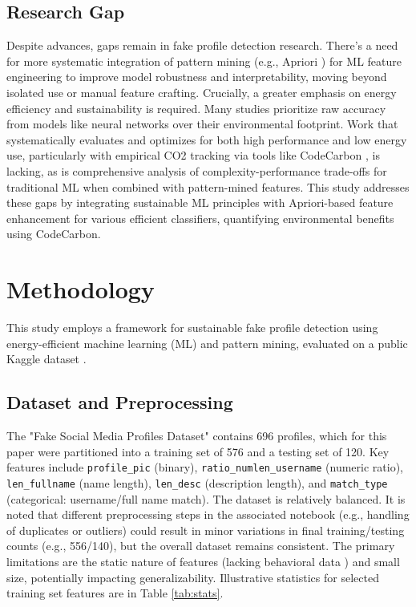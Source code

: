 \documentclass[conference]{IEEEtran}
\begin{document}
\subsection{Research Gap}
Despite advances, gaps remain in fake profile detection research. There's a need for more systematic integration of pattern mining (e.g., Apriori \cite{b10}) for ML feature engineering to improve model robustness and interpretability, moving beyond isolated use or manual feature crafting. Crucially, a greater emphasis on energy efficiency and sustainability is required. Many studies prioritize raw accuracy from models like neural networks \cite{b6, b4} over their environmental footprint. Work that systematically evaluates and optimizes for both high performance and low energy use, particularly with empirical CO2 tracking via tools like CodeCarbon \cite{b13}, is lacking, as is comprehensive analysis of complexity-performance trade-offs for traditional ML \cite{b7, b3} when combined with pattern-mined features. This study addresses these gaps by integrating sustainable ML principles with Apriori-based feature enhancement for various efficient classifiers, quantifying environmental benefits using CodeCarbon.

\section{Methodology}
\label{sec:method}
This study employs a framework for sustainable fake profile detection using energy-efficient machine learning (ML) and pattern mining, evaluated on a public Kaggle dataset \cite{b5}.

\subsection{Dataset and Preprocessing}
The "Fake Social Media Profiles Dataset" \cite{b5} contains 696 profiles, which for this paper were partitioned into a training set of 576 and a testing set of 120. Key features include \texttt{profile\_pic} (binary), \texttt{ratio\_numlen\_username} (numeric ratio), \texttt{len\_fullname} (name length), \texttt{len\_desc} (description length), and \texttt{match\_type} (categorical: username/full name match). The dataset is relatively balanced. It is noted that different preprocessing steps in the associated notebook (e.g., handling of duplicates or outliers) could result in minor variations in final training/testing counts (e.g., 556/140), but the overall dataset remains consistent. The primary limitations are the static nature of features (lacking behavioral data \cite{b12}) and small size, potentially impacting generalizability. Illustrative statistics for selected training set features are in Table \ref{tab:stats}.
\end{document}
